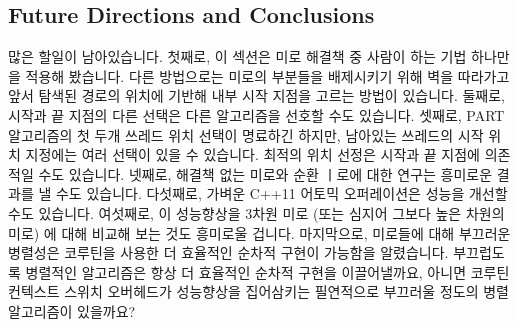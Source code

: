 \subsection{Future Directions and Conclusions}
\label{sec:SMPdesign:Future Directions and Conclusions}

많은 할일이 남아있습니다.
첫째로, 이 섹션은 미로 해결책 중 사람이 하는 기법 하나만을 적용해 봤습니다.
다른 방법으로는 미로의 부분들을 배제시키기 위해 벽을 따라가고 앞서 탐색된
경로의 위치에 기반해 내부 시작 지점을 고르는 방법이 있습니다.
둘째로, 시작과 끝 지점의 다른 선택은 다른 알고리즘을 선호할 수도 있습니다.
셋째로, PART 알고리즘의 첫 두개 쓰레드 위치 선택이 명료하긴 하지만, 남아있는
쓰레드의 시작 위치 지정에는 여러 선택이 있을 수 있습니다.
최적의 위치 선정은 시작과 끝 지점에 의존적일 수도 있습니다.
넷째로, 해결책 없는 미로와 순환 ㅣ로에 대한 연구는 흥미로운 결과를 낼 수도
있습니다.
다섯째로, 가벼운 C++11 어토믹 오퍼레이션은 성능을 개선할 수도 있습니다.
여섯째로, 이 성능향상을 3차원 미로 (또는 심지어 그보다 높은 차원의 미로) 에
대해 비교해 보는 것도 흥미로울 겁니다.
마지막으로, 미로들에 대해 부끄러운 병렬성은 코루틴을 사용한 더 효율적인 순차적
구현이 가능함을 알렸습니다.
부끄럽도록 병렬적인 알고리즘은 항상 더 효율적인 순차적 구현을 이끌어낼까요,
아니면 코루틴 컨텍스트 스위치 오버헤드가 성능향상을 집어삼키는 필연적으로
부끄러울 정도의 병렬 알고리즘이 있을까요?

